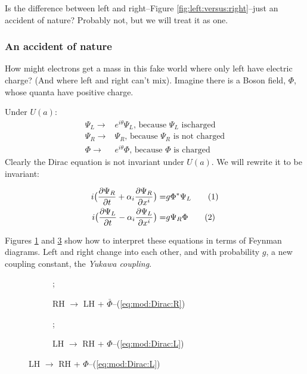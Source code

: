 \documentclass[]{article}
\newcommand\numberthis{\addtocounter{equation}{1}\tag{\theequation}}
\begin{document}
 Is the difference between left and right--Figure \ref{fig:left:versus:right}--just an accident of nature? Probably not, but we will treat it as one.
 
 \subsubsection{An accident of nature}
 
 How might electrons get a mass in this fake world where only left have electric charge? (And where left and right can't mix). Imagine there is a Boson field, $\Phi$, whose quanta have positive charge.
 
 Under $U(a)$:
 \begin{align*}
 	\Psi_L \rightarrow& e^{i\theta} \Psi_L \text{, because $\Psi_L$ ischarged}\\
 	\Psi_R \rightarrow& \Psi_R \text{, because $\Psi_R$ is not charged}\\
 	\Phi \rightarrow& e^{i\theta} \Phi \text{, because $\Phi$ is charged}
 \end{align*}
 Clearly the Dirac equation is not invariant under $U(a)$. We will rewrite it to be invariant:
 
 \begin{align*}
	 i \big(\frac{\partial \Psi_R}{\partial t} + \alpha_i \frac{\partial \Psi_R}{\partial 	x^i}\big) =& g \Phi^* \Psi_L \numberthis \label{eq:mod:Dirac:R}\\
	 i \big(\frac{\partial \Psi_L}{\partial t} - \alpha_i \frac{\partial \Psi_L}{\partial 	x^i}\big) =& g \Psi_R \Phi \numberthis \label{eq:mod:Dirac:L}
 \end{align*}
 
 Figures \ref{fig:modified:Dirac1} and \ref{fig:modified:Dirac2} show how to interpret these equations in terms of Feynman diagrams. Left and right change into each other, and with probability $g$, a new coupling constant, the \emph{Yukawa coupling}.
 
 \begin{figure}[H]
 	\caption{Interpretation of modified Dirac equation}\label{fig:modified:Dirac}
 	\begin{subfigure}[t]{0.45\textwidth}
 		\caption{RH $\rightarrow$ LH + $\bar{\Phi}$--(\ref{eq:mod:Dirac:R})}\label{fig:modified:Dirac1}
 		;
 	\end{subfigure}
 	\hfill
  	\begin{subfigure}[t]{0.45\textwidth}
  		\caption{LH  $\rightarrow$ RH + $\Phi$--(\ref{eq:mod:Dirac:L})}\label{fig:modified:Dirac2}
	 	;
	 \end{subfigure}
	 
 \end{figure}
\end{document}
